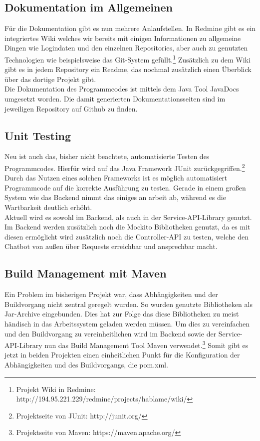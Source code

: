 \subsection{Dokumentation im Allgemeinen}
Für die Dokumentation gibt es nun mehrere Anlaufstellen. In Redmine gibt es ein integriertes Wiki welches wir bereits mit einigen Informationen zu allgemeine Dingen wie Logindaten und den einzelnen Repositories, aber auch zu genutzten Technologien wie beispielsweise das Git-System gefüllt.\footnote{Projekt Wiki in Redmine: http://194.95.221.229/redmine/projects/hablame/wiki/}
Zusätzlich zu dem Wiki gibt es in jedem Repository ein Readme, das nochmal zusätzlich einen Überblick über das dortige Projekt gibt.\\
Die Dokumentation des Programmcodes ist mittels dem Java Tool JavaDocs umgesetzt worden. Die damit generierten Dokumentationsseiten sind im jeweiligen Repository auf Github zu finden.

\subsection{Unit Testing}
Neu ist auch das, bisher nicht beachtete, automatisierte Testen des Programmcodes. Hierfür wird auf das Java Framework JUnit zurückgegriffen.\footnote{Projektseite von JUnit: http://junit.org/} Durch das Nutzen eines solchen Frameworks ist es möglich automatisiert Programmcode auf die korrekte Ausführung zu testen. Gerade in einem großen System wie das Backend nimmt das einiges an arbeit ab, während es die Wartbarkeit deutlich erhöht.\\
Aktuell wird es sowohl im Backend, als auch in der Service-API-Library genutzt.\\
Im Backend werden zusätzlich noch die Mockito Bibliotheken genutzt, da es mit diesen ermöglicht wird zusätzlich noch die Controller-API zu testen, welche den Chatbot von außen über Requests erreichbar und ansprechbar macht.

\subsection{Build Management mit Maven}
Ein Problem im bisherigen Projekt war, dass Abhängigkeiten und der Buildvorgang nicht zentral geregelt wurden. So wurden genutzte Bibliotheken als Jar-Archive eingebunden. Dies hat zur Folge das diese Bibliotheken zu meist händisch in das Arbeitssystem geladen werden müssen. Um dies zu vereinfachen und den Buildvorgang zu vereinheitlichen wird im Backend sowie der Service-API-Library nun das Build Management Tool Maven verwendet.\footnote{Projektseite von Maven: https://maven.apache.org/} Somit gibt es jetzt in beiden Projekten einen einheitlichen Punkt für die Konfiguration der Abhängigkeiten und des Buildvorgangs, die pom.xml.

